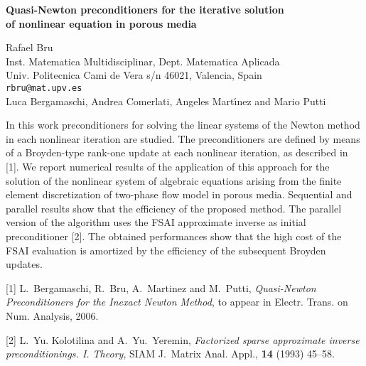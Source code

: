 \documentclass{report}
\begin{document}

\begin{center}
{\large
{\bf Quasi-Newton preconditioners for the iterative solution \\
	of nonlinear equation in porous media}}

	Rafael Bru \\
	Inst. Matematica Multidisciplinar, Dept. Matematica Aplicada \\
	Univ. Politecnica Cami de Vera s/n 46021, Valencia, Spain \\
	{\tt rbru@mat.upv.es} \\
	Luca Bergamaschi, Andrea Comerlati,
	Angeles Mart\'{\i}nez and Mario Putti
\end{center}
In this work preconditioners for solving the linear systems
of the Newton method in each nonlinear iteration are
studied. The preconditioners are defined by means of a
Broyden-type rank-one update at each nonlinear iteration, as
described in [1]. We report numerical results of the
application of this approach for the solution of the
nonlinear system of algebraic equations arising from the
finite element discretization of two-phase flow model in
porous media. Sequential and parallel results show that the
efficiency of the proposed method. The parallel version of
the algorithm uses the FSAI approximate inverse as initial
preconditioner [2]. The obtained performances show that the
high cost of the FSAI evaluation is amortized by the
efficiency of the subsequent Broyden updates.

[1]
L.~Bergamaschi, R.~Bru, A.~Martinez and M.~Putti,
{\em Quasi-Newton Preconditioners for the Inexact Newton
Method}, to appear in Electr. Trans. on Num. Analysis,
2006.

[2] L.~Yu. Kolotilina and A.~Yu.~Yeremin,
{\em Factorized sparse approximate inverse preconditionings.
I. Theory},
SIAM J.~Matrix Anal. Appl., {\bf 14} (1993) 45--58.


\end{document}
